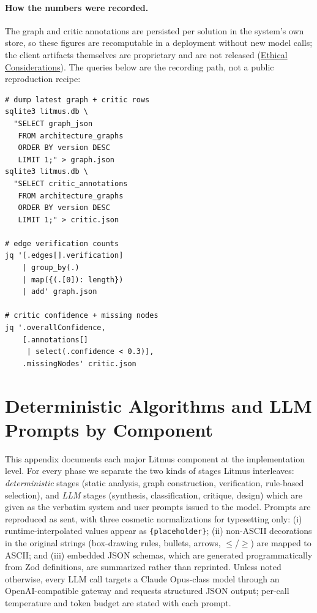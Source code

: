 \documentclass[11pt]{article}
\begin{document}
\paragraph{How the numbers were recorded.}
The graph and critic annotations are persisted per solution in the system's own store, so these figures are recomputable in a deployment without new model calls; the client artifacts themselves are proprietary and are not released (\hyperref[sec:ethics]{Ethical Considerations}). The queries below are the recording path, not a public reproduction recipe:
{\footnotesize
\begin{verbatim}
# dump latest graph + critic rows
sqlite3 litmus.db \
  "SELECT graph_json
   FROM architecture_graphs
   ORDER BY version DESC
   LIMIT 1;" > graph.json
sqlite3 litmus.db \
  "SELECT critic_annotations
   FROM architecture_graphs
   ORDER BY version DESC
   LIMIT 1;" > critic.json

# edge verification counts
jq '[.edges[].verification]
    | group_by(.)
    | map({(.[0]): length})
    | add' graph.json

# critic confidence + missing nodes
jq '.overallConfidence,
    [.annotations[]
     | select(.confidence < 0.3)],
    .missingNodes' critic.json
\end{verbatim}
}
\section{Deterministic Algorithms and LLM Prompts by Component}
\label{app:impl}

This appendix documents each major Litmus component at the implementation level. For every phase we separate the two kinds of stages Litmus interleaves: \emph{deterministic} stages (static analysis, graph construction, verification, rule-based selection), and \emph{LLM} stages (synthesis, classification, critique, design) which are given as the verbatim system and user prompts issued to the model. Prompts are reproduced as sent, with three cosmetic normalizations for typesetting only: (i) runtime-interpolated values appear as \texttt{\{placeholder\}}; (ii) non-ASCII decorations in the original strings (box-drawing rules, bullets, arrows, $\leq$/$\geq$) are mapped to ASCII; and (iii) embedded JSON schemas, which are generated programmatically from Zod definitions, are summarized rather than reprinted. Unless noted otherwise, every LLM call targets a Claude Opus-class model through an OpenAI-compatible gateway and requests structured JSON output; per-call temperature and token budget are stated with each prompt.
\end{document}
